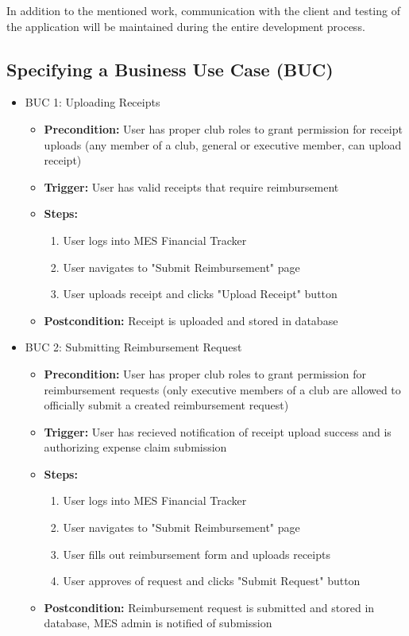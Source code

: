 \documentclass[12pt]{article}
\begin{document}
    In addition to the mentioned work, communication with the client and testing of the application will be maintained during the entire development process.
  \subsection{Specifying a Business Use Case (BUC)}
  \begin{itemize}
    \item BUC 1: Uploading Receipts
      \begin{itemize}
        \item \textbf{Precondition:} User has proper club roles to grant permission for receipt uploads (any member of a club, general or executive member, can upload receipt)
        \item \textbf{Trigger:} User has valid receipts that require reimbursement
        \item \textbf{Steps:}
          \begin{enumerate}
            \item User logs into MES Financial Tracker
            \item User navigates to "Submit Reimbursement" page
            \item User uploads receipt and clicks "Upload Receipt" button
          \end{enumerate}
        \item \textbf{Postcondition:} Receipt is uploaded and stored in database
      \end{itemize}

    \item BUC 2: Submitting Reimbursement Request 
      \begin{itemize}
        \item \textbf{Precondition:} User has proper club roles to grant permission for reimbursement requests (only executive members of a club are allowed to officially submit a created reimbursement request)
        \item \textbf{Trigger:} User has recieved notification of receipt upload success and is authorizing expense claim submission
        \item \textbf{Steps:}
          \begin{enumerate}
            \item User logs into MES Financial Tracker
            \item User navigates to "Submit Reimbursement" page
            \item User fills out reimbursement form and uploads receipts 
            \item User approves of request and clicks "Submit Request" button
          \end{enumerate}
        \item \textbf{Postcondition:} Reimbursement request is submitted and stored in database, MES admin is notified of submission 
      \end{itemize}


\end{itemize}
\end{document}
